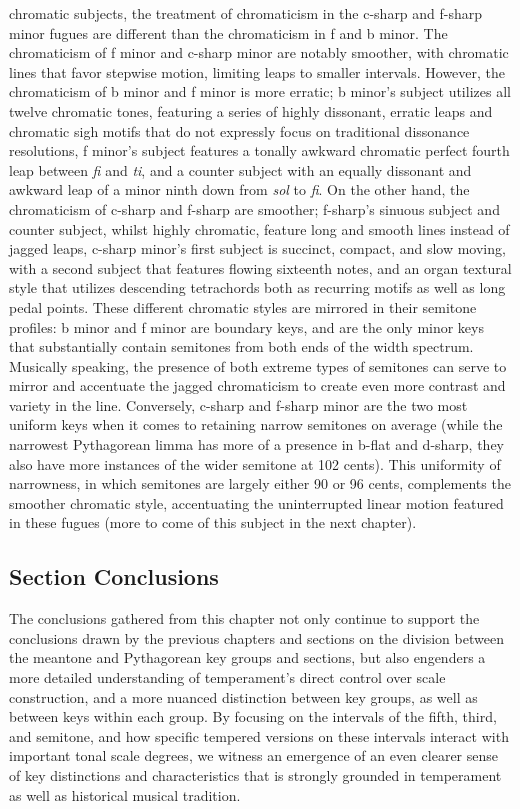 \begin{itemize}
  chromatic subjects, the treatment of chromaticism in the c-sharp and
  f-sharp minor fugues are different than the chromaticism in f and b
  minor. The chromaticism of f minor and c-sharp minor are notably
  smoother, with chromatic lines that favor stepwise motion, limiting
  leaps to smaller intervals. However, the chromaticism of b minor and f
  minor is more erratic; b minor's subject utilizes all twelve chromatic
  tones, featuring a series of highly dissonant, erratic leaps and
  chromatic sigh motifs that do not expressly focus on traditional
  dissonance resolutions, f minor's subject features a tonally awkward
  chromatic perfect fourth leap between \emph{fi} and \emph{ti}, and a
  counter subject with an equally dissonant and awkward leap of a minor
  ninth down from \emph{sol} to \emph{fi}. On the other hand, the
  chromaticism of c-sharp and f-sharp are smoother; f-sharp's sinuous
  subject and counter subject, whilst highly chromatic, feature long and
  smooth lines instead of jagged leaps, c-sharp minor's first subject is
  succinct, compact, and slow moving, with a second subject that
  features flowing sixteenth notes, and an organ textural style that
  utilizes descending tetrachords both as recurring motifs as well as
  long pedal points. These different chromatic styles are mirrored in
  their semitone profiles: b minor and f minor are boundary keys, and
  are the only minor keys that substantially contain semitones from both
  ends of the width spectrum. Musically speaking, the presence of both
  extreme types of semitones can serve to mirror and accentuate the
  jagged chromaticism to create even more contrast and variety in the
  line. Conversely, c-sharp and f-sharp minor are the two most uniform
  keys when it comes to retaining narrow semitones on average (while the
  narrowest Pythagorean limma has more of a presence in b-flat and
  d-sharp, they also have more instances of the wider semitone at 102
  cents). This uniformity of narrowness, in which semitones are largely
  either 90 or 96 cents, complements the smoother chromatic style,
  accentuating the uninterrupted linear motion featured in these fugues
  (more to come of this subject in the next chapter).
\end{itemize}

    \subsection{Section Conclusions}\label{section-conclusions}

The conclusions gathered from this chapter not only continue to support
the conclusions drawn by the previous chapters and sections on the
division between the meantone and Pythagorean key groups and sections,
but also engenders a more detailed understanding of temperament's direct
control over scale construction, and a more nuanced distinction between
key groups, as well as between keys within each group. By focusing on
the intervals of the fifth, third, and semitone, and how specific
tempered versions on these intervals interact with important tonal scale
degrees, we witness an emergence of an even clearer sense of key
distinctions and characteristics that is strongly grounded in
temperament as well as historical musical tradition.

